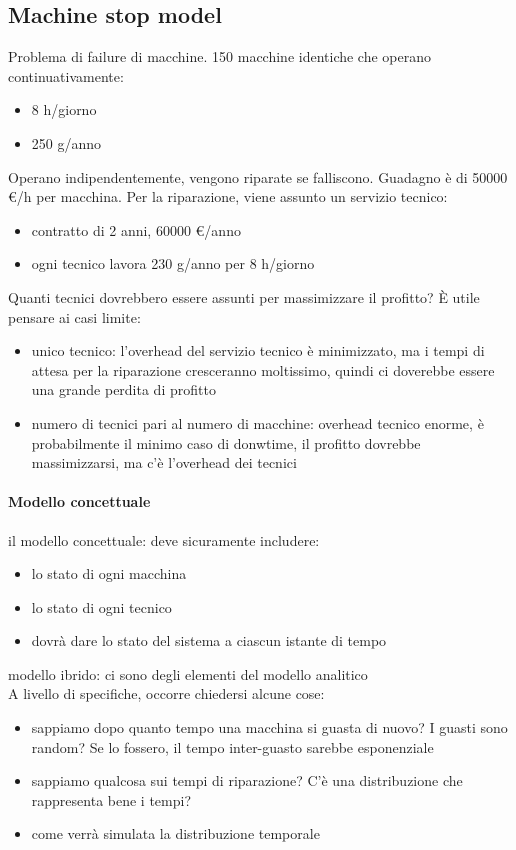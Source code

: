 \documentclass{article}
\begin{document}
\subsection{Machine stop model}\label{machine}
Problema di failure di macchine. 150 macchine identiche che operano continuativamente:
\begin{itemize}
\item 8 h/giorno
\item 250 g/anno
\end{itemize}
Operano indipendentemente, vengono riparate se falliscono. Guadagno è di 50000 €/h per macchina. Per la riparazione, viene assunto un servizio tecnico:
\begin{itemize}
\item contratto di 2 anni, 60000 €/anno
\item ogni tecnico lavora 230 g/anno per 8 h/giorno
\end{itemize}
Quanti tecnici dovrebbero essere assunti per massimizzare il profitto? È utile pensare ai casi limite:
\begin{itemize}
\item unico tecnico: l'overhead del servizio tecnico è minimizzato, ma i tempi di attesa per la riparazione cresceranno moltissimo, quindi ci doverebbe essere una grande perdita di profitto
\item numero di tecnici pari al numero di macchine: overhead tecnico enorme, è probabilmente il minimo caso di donwtime, il profitto dovrebbe massimizzarsi, ma c'è l'overhead dei tecnici
\end{itemize}
\paragraph{Modello concettuale}il modello concettuale: deve sicuramente includere:
\begin{itemize}
\item lo stato di ogni macchina
\item lo stato di ogni tecnico
\item dovrà dare lo stato del sistema a ciascun istante di tempo
\end{itemize}
modello ibrido: ci sono degli elementi del modello analitico\\ A livello di specifiche, occorre chiedersi alcune cose:
\begin{itemize}
\item sappiamo dopo quanto tempo una macchina si guasta di nuovo? I guasti sono random? Se lo fossero, il tempo inter-guasto sarebbe esponenziale
\item sappiamo qualcosa sui tempi di riparazione? C'è una distribuzione che rappresenta bene i tempi?
\item come verrà simulata la distribuzione temporale
\end{itemize}
\end{document}
